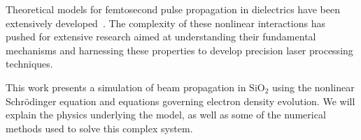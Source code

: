 Theoretical models for femtosecond pulse propagation in dielectrics have been extensively developed~\cite{couairon2007}. The complexity of these nonlinear interactions has pushed for extensive research aimed at understanding their fundamental mechanisms and harnessing these properties to develop precision laser processing techniques.

This work presents a simulation of beam propagation in $\mathrm{SiO}_2$ using the nonlinear Schr\"odinger equation and equations governing electron density evolution. We will explain the physics underlying the model, as well as some of the numerical methods used to solve this complex system.
